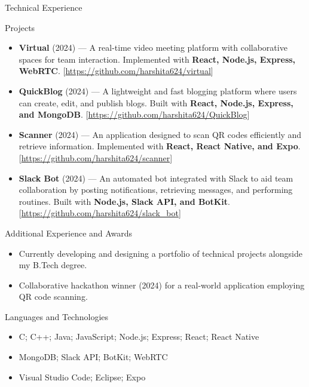\documentclass[]{mcdowellcv}
\begin{document}
	\begin{cvsection}{Technical Experience}
		\begin{cvsubsection}{Projects}{}{}
			\begin{itemize}
				\item \textbf{Virtual} (2024) — A real-time video meeting platform with collaborative spaces for team interaction. Implemented with \textbf{React, Node.js, Express, WebRTC}. [\url{https://github.com/harshita624/virtual}] 
				\item \textbf{QuickBlog} (2024) — A lightweight and fast blogging platform where users can create, edit, and publish blogs. Built with \textbf{React, Node.js, Express, and MongoDB}. [\url{https://github.com/harshita624/QuickBlog}] 
				\item \textbf{Scanner} (2024) — An application designed to scan QR codes efficiently and retrieve information. Implemented with \textbf{React, React Native, and Expo}. [\url{https://github.com/harshita624/scanner}] 
				\item \textbf{Slack Bot} (2024) — An automated bot integrated with Slack to aid team collaboration by posting notifications, retrieving messages, and performing routines. Built with \textbf{Node.js, Slack API, and BotKit}. [\url{https://github.com/harshita624/slack_bot}] 
			\end{itemize}
		\end{cvsubsection}
	\end{cvsection}
	
	\begin{cvsection}{Additional Experience and Awards}
		\begin{cvsubsection}{}{}{}	
			\begin{itemize}
				\item Currently developing and designing a portfolio of technical projects alongside my B.Tech degree.
				\item Collaborative hackathon winner (2024) for a real-world application employing QR code scanning.
			\end{itemize}
		\end{cvsubsection}
	\end{cvsection}
	
	\begin{cvsection}{Languages and Technologies}
		\begin{cvsubsection}{}{}{}	
			\begin{itemize}
				\item C; C++; Java; JavaScript; Node.js; Express; React; React Native
				\item MongoDB; Slack API; BotKit; WebRTC
				\item Visual Studio Code; Eclipse; Expo
			\end{itemize}
		\end{cvsubsection}
	\end{cvsection}
\end{document}
